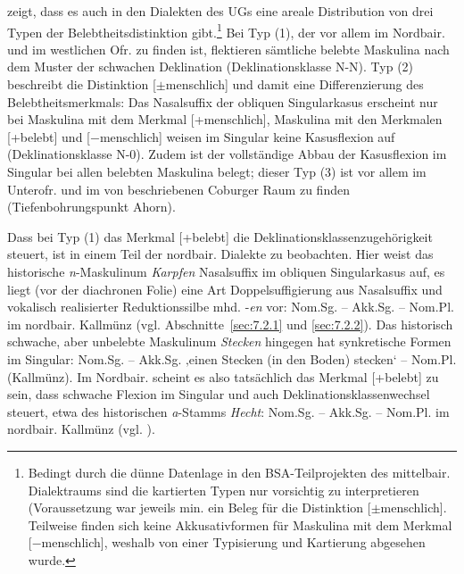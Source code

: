  zeigt, dass es auch in den Dialekten des UGs eine areale Distribution von drei Typen der Belebtheitsdistinktion gibt.\footnote{Bedingt durch die dünne Datenlage in den BSA-Teilprojekten des mittelbair. Dialektraums sind die kartierten Typen nur vorsichtig zu interpretieren (Voraussetzung war jeweils min. ein Beleg für die Distinktion [{${\pm}$}menschlich]. Teilweise finden sich keine Akkusativformen für Maskulina mit dem Merkmal [$-$menschlich], weshalb von einer Typisierung und Kartierung abgesehen wurde.}  Bei Typ (1), der vor allem im Nordbair. und im westlichen Ofr. zu finden ist, flektieren sämtliche belebte Maskulina nach dem Muster der schwachen Deklination (Deklinationsklasse N-N). Typ (2) beschreibt die Distinktion [${\pm}$menschlich] und damit eine Differenzierung des Belebtheitsmerkmals: Das Nasalsuffix der obliquen Singularkasus erscheint nur bei Maskulina mit dem Merkmal [+menschlich], Maskulina mit den Merkmalen [+belebt] und [$-$menschlich] weisen im Singular keine Kasusflexion auf (Deklinationsklasse N-0). Zudem ist der vollständige Abbau der Kasusflexion im Singular bei allen belebten Maskulina belegt; dieser Typ (3) ist vor allem im Unterofr. und im von \citet{Rowley1997} beschriebenen Coburger Raum zu finden (Tiefenbohrungspunkt Ahorn).

Dass bei Typ (1) das Merkmal [+belebt] die Deklinationsklassenzugehörigkeit steuert, ist in einem Teil der nordbair. Dialekte zu beobachten. Hier weist das his\-to\-ri\-sche \textit{n}{}-Maskulinum \textit{Karpfen} Nasalsuffix im obliquen Singularkasus auf, es liegt (vor der diachronen Folie) eine Art Doppelsuffigierung aus Nasalsuffix und vokalisch realisierter Reduktionssilbe mhd. -\textit{en} vor: Nom.Sg.  -- Akk.Sg.   -- Nom.Pl.  im nordbair. Kallmünz (vgl. Abschnitte~\ref{sec:7.2.1} und \ref{sec:7.2.2}). Das his\-to\-risch schwache, aber unbelebte Maskulinum \textit{Stecken} hingegen hat synkretische Formen im Singular: Nom.Sg.  -- Akk.Sg.   ‚einen Stecken (in den Boden) stecken‘ -- Nom.Pl.  (Kallmünz). Im Nordbair. scheint es also tatsächlich das Merkmal [+belebt] zu sein, dass schwache Flexion im Singular und auch Deklinationsklassenwechsel steuert, etwa des historischen \textit{a}{}-Stamms \textit{Hecht}: Nom.Sg.  -- Akk.Sg.   -- Nom.Pl.  im nordbair. Kallmünz (vgl. \citealt[§32.2]{Paul1968}).

